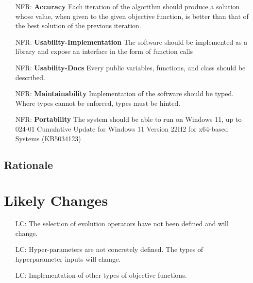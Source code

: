 \documentclass[12pt]{article}
\newcounter{nfrnum} %
\newcounter{lcnum} %
\begin{document}
\noindent \begin{itemize}

\item[NFR\refstepcounter{nfrnum}\thenfrnum \label{NFR_Accuracy}:]
  \textbf{Accuracy} Each iteration of the algorithm should produce a solution whose value, when given to the given objective function, is better than that of the best solution of the previous iteration.

\item[NFR\refstepcounter{nfrnum}\thenfrnum \label{NFR_Usability-Impl}:] \textbf{Usability-Implementation}
  The software should be implemented as a library and expose an interface in the form of function calls

  \item[NFR\refstepcounter{nfrnum}\thenfrnum \label{NFR_Usability}:] \textbf{Usability-Docs}
  Every public variables, functions, and class should be described.

\item[NFR\refstepcounter{nfrnum}\thenfrnum \label{NFR_Maintainability}:]
  \textbf{Maintainability} 
  Implementation of the software should be typed. Where types cannot be enforced, types must be hinted.

\item[NFR\refstepcounter{nfrnum}\thenfrnum \label{NFR_Portability}:]
  \textbf{Portability} The system should be able to run on Windows 11, up to 024-01 Cumulative Update for Windows 11 Version 22H2 for x64-based Systems (KB5034123)
  

\end{itemize}

\subsection{Rationale}
\label{subsubsec:rationale}


\section{Likely Changes}
\label{sec:lchanges}

\noindent \begin{itemize}

\item[LC\refstepcounter{lcnum}\thelcnum\label{LC_EVOP}:] The selection of evolution operators have not been defined and will change.
\item[LC\refstepcounter{lcnum}\thelcnum\label{LC_HYPER}:] Hyper-parameters are not concretely defined. The types of hyperparameter inputs will change.
\item[LC\refstepcounter{lcnum}\thelcnum\label{LC_OBJC}:] Implementation of other types of objective functions.

\end{itemize}
\end{document}
